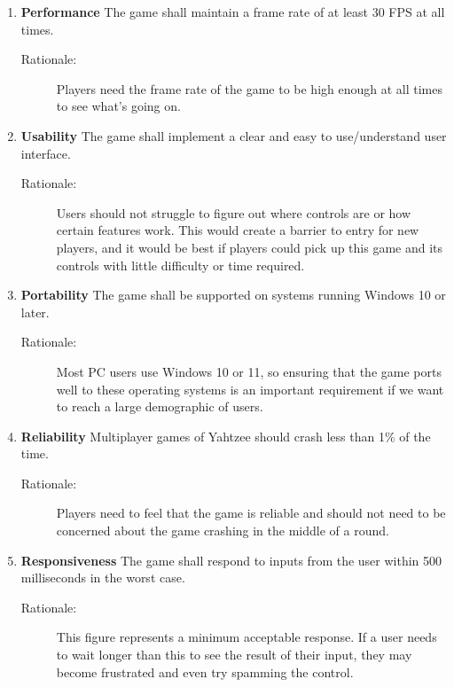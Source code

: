 \begin{enumerate}[label=NFR\arabic*, start=1, left=0pt]

    \item \textbf{Performance} The game shall maintain a frame rate of at least 30 FPS at all times.
    \begin{description}
        \item[Rationale:] Players need the frame rate of the game to be high enough at all times to see what’s going on.
    \end{description}

    \item \textbf{Usability} The game shall implement a clear and easy to use/understand user interface.
    \begin{description}
        \item[Rationale:] Users should not struggle to figure out where controls are or how certain features work. This would create a barrier to entry for new players, and it would be best if players could pick up this game and its controls with little difficulty or time required.
    \end{description}

    \item \textbf{Portability} The game shall be supported on systems running Windows 10 or later.
    \begin{description}
        \item[Rationale:] Most PC users use Windows 10 or 11, so ensuring that the game ports well to these operating systems is an important requirement if we want to reach a large demographic of users.
    \end{description}

    \item \textbf{Reliability} Multiplayer games of Yahtzee should crash less than 1\% of the time.
    \begin{description}
        \item[Rationale:] Players need to feel that the game is reliable and should not need to be concerned about the game crashing in the middle of a round.
    \end{description}

    \item \textbf{Responsiveness} The game shall respond to inputs from the user within 500 milliseconds in the worst case.
    \begin{description}
        \item[Rationale:] This figure represents a minimum acceptable response. If a user needs to wait longer than this to see the result of their input, they may become frustrated and even try spamming the control.
    \end{description}


\end{enumerate}
